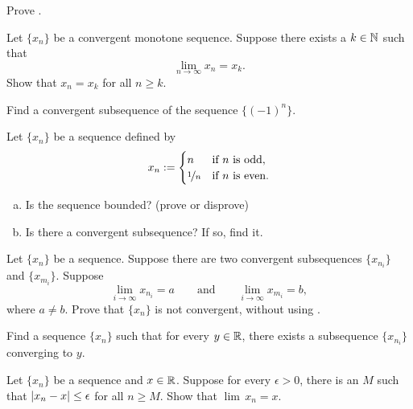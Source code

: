 \begin{exercise}
Prove .
\end{exercise}

\begin{exercise}
Let $\{ x_n \}$ be a convergent monotone sequence.  Suppose 
there exists a $k \in {\mathbb{N}}$ such that
\begin{equation*}
\lim_{n\to \infty} x_n = x_k .
\end{equation*}
Show that $x_n = x_k$ for all $n \geq k$.
\end{exercise}

\begin{exercise}
Find a convergent subsequence of the sequence
$\{ {(-1)}^n \}$.
\end{exercise}

\begin{exercise}
Let $\{x_n\}$ be a sequence defined by
\begin{equation*}
x_n := 
\begin{cases}
n               & \text{if } n \text{ is odd} , \\
\nicefrac{1}{n} & \text{if } n \text{ is even} .
\end{cases}
\end{equation*}
\begin{enumerate}[a)]
\item Is the sequence bounded? (prove or disprove)
\item Is there a convergent subsequence?  If so, find it.
\end{enumerate}
\end{exercise}

\begin{exercise}
Let $\{ x_n \}$ be a sequence.
Suppose there are two convergent subsequences $\{ x_{n_i} \}$ and
$\{ x_{m_i} \}$.  Suppose 
\begin{equation*}
\lim_{i\to\infty} x_{n_i} = a
\qquad \text{and} \qquad
\lim_{i\to\infty} x_{m_i} = b,
\end{equation*}
where $a \not= b$.  Prove that $\{ x_n \}$ is not convergent, without
using .
\end{exercise}

\begin{exercise}[Tricky]
Find a sequence $\{ x_n \}$ such that for every $y \in {\mathbb{R}}$, there exists a
subsequence $\{ x_{n_i} \}$ converging to $y$.
\end{exercise}

\begin{exercise}[Easy]
Let $\{ x_n \}$ be a sequence and $x \in {\mathbb{R}}$.
Suppose for every $\epsilon > 0$, there is an $M$ such that
$\left\lvert {x_n-x} \right\rvert \leq \epsilon$ for all $n \geq M$.
Show that $\lim\, x_n = x$.
\end{exercise}

